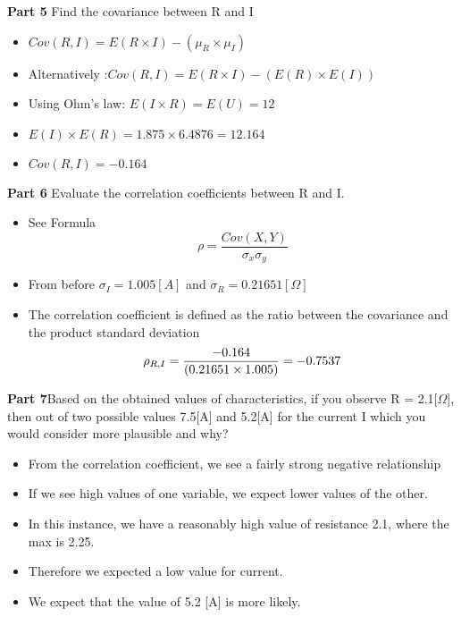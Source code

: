 \noindent\textbf{Part 5} Find the covariance between R and I\\



\begin{itemize}
\item $Cov(R,I) = E(R\times I) - \left(\mu_R \times \mu_I \right)$
\item Alternatively :$Cov(R,I) = E(R\times I) - \left(E(R) \times E(I) \right)$
\item Using Ohm's law: $E (I \times R) = E(U)  =12$
\item $E(I) \times E(R) = 1.875 \times 6.4876 = 12.164$
\item $Cov(R,I) = -0.164$
\end{itemize}




\noindent\textbf{Part 6} Evaluate the correlation coefficients between R and I.\\

\begin{itemize}
\item See Formula
\[ \rho = \frac{Cov(X,Y)}{\sigma_x \sigma_y} \]
\item From before $\sigma_I =1.005 [A]$ and $\sigma_R =0.21651 [\Omega]$
\item
The correlation coefficient is defined as the ratio between the covariance and the product
standard deviation
\[\rho_{R,I} = { -0.164 \over (0.21651 \times 1.005)} = -0.7537 \]

\end{itemize}



\noindent\textbf{Part 7}Based on the obtained values of characteristics, if you observe R = 2.1[$\Omega
$], then out of two
possible values 7.5[A] and 5.2[A] for the current I which you would consider more plausible and
why?

\begin{itemize}
\item From the correlation coefficient, we see a fairly strong negative relationship
\item If we see high values of one variable, we expect lower values of the other.
\item In this instance, we have a reasonably high value of resistance 2.1, where the max is 2.25.
\item Therefore we expected a low value for current.
\item We expect that the value of 5.2 [A] is more likely.

\end{itemize}
